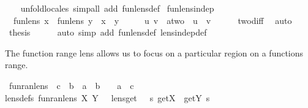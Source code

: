 \begin{isabellebody}
%
\isadelimproof
\ \ %
\endisadelimproof
%
\isatagproof
{}\isamarkupfalse%
\ {\isacharparenleft}unfold{\isacharunderscore}locales{\isacharcomma}\ simp{\isacharunderscore}all\ add{\isacharcolon}\ fun{\isacharunderscore}lens{\isacharunderscore}def{\isacharparenright}%
\endisatagproof
{\isafoldproof}%
%
\isadelimproof
\isanewline
%
\endisadelimproof
\isanewline
{}\isamarkupfalse%
\ fun{\isacharunderscore}lens{\isacharunderscore}indep{\isacharcolon}\isanewline
\ \ {\isachardoublequoteopen}fun{\isacharunderscore}lens\ x\ {\isasymbowtie}\ fun{\isacharunderscore}lens\ y\ {\isasymlongleftrightarrow}\ x\ {\isasymnoteq}\ y{\isachardoublequoteclose}\isanewline
%
\isadelimproof
%
\endisadelimproof
%
\isatagproof
{}\isamarkupfalse%
\ {\isacharminus}\isanewline
\ \ \isamarkupfalse%
\ u\ v\ {\isacharcolon}{\isacharcolon}\ {\isachardoublequoteopen}{\isacharprime}a{\isacharcolon}{\isacharcolon}two{\isachardoublequoteclose}\ \ {\isachardoublequoteopen}u\ {\isasymnoteq}\ v{\isachardoublequoteclose}\isanewline
\ \ \ \ \isamarkupfalse%
\ two{\isacharunderscore}diff\ \isamarkupfalse%
\ auto\isanewline
\ \ \isamarkupfalse%
\ {\isacharquery}thesis\isanewline
\ \ \ \ \isamarkupfalse%
\ {\isacharparenleft}auto\ simp\ add{\isacharcolon}\ fun{\isacharunderscore}lens{\isacharunderscore}def\ lens{\isacharunderscore}indep{\isacharunderscore}def{\isacharparenright}\isanewline
{}\isamarkupfalse%
%
\endisatagproof
{\isafoldproof}%
%
\isadelimproof
%
\endisadelimproof
%
\begin{isamarkuptext}%
The function range lens allows us to focus on a particular region on a functions range.%
\end{isamarkuptext}\isamarkuptrue%
\isamarkupfalse%
\ fun{\isacharunderscore}ran{\isacharunderscore}lens\ {\isacharcolon}{\isacharcolon}\ {\isachardoublequoteopen}{\isacharparenleft}{\isacharprime}c\ {\isasymLongrightarrow}\ {\isacharprime}b{\isacharparenright}\ {\isasymRightarrow}\ {\isacharparenleft}{\isacharparenleft}{\isacharprime}a\ {\isasymRightarrow}\ {\isacharprime}b{\isacharparenright}\ {\isasymLongrightarrow}\ {\isacharprime}{\isasymalpha}{\isacharparenright}\ {\isasymRightarrow}\ {\isacharparenleft}{\isacharparenleft}{\isacharprime}a\ {\isasymRightarrow}\ {\isacharprime}c{\isacharparenright}\ {\isasymLongrightarrow}\ {\isacharprime}{\isasymalpha}{\isacharparenright}{\isachardoublequoteclose}\ \isanewline
{\isacharbrackleft}lens{\isacharunderscore}defs{\isacharbrackright}{\isacharcolon}\ {\isachardoublequoteopen}fun{\isacharunderscore}ran{\isacharunderscore}lens\ X\ Y\ {\isacharequal}\ {\isasymlparr}\ lens{\isacharunderscore}get\ {\isacharequal}\ {\isasymlambda}\ s{\isachardot}\ get\isactrlbsub X\isactrlesub \ {\isasymcirc}\ get\isactrlbsub Y\isactrlesub \ s\isanewline

\end{isabellebody}
